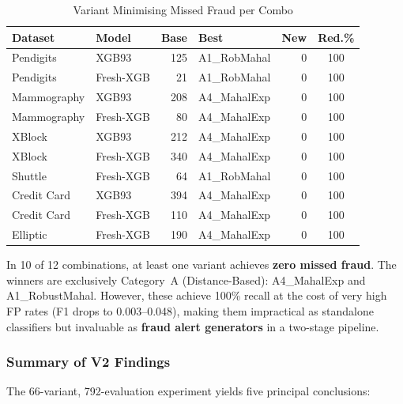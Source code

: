 \documentclass[journal]{IEEEtran}
\begin{document}
\begin{table}[!t]
\centering
\caption{Variant Minimising Missed Fraud per Combo}
\label{tab:missed_best}
\setlength{\tabcolsep}{3pt}
\begin{tabular}{@{}llrlrc@{}}
\toprule
\textbf{Dataset} & \textbf{Model} & \textbf{Base} & \textbf{Best} & \textbf{New} & \textbf{Red.\%} \\
\midrule
Pendigits  & XGB93     & 125 & A1\_RobMahal & 0 & 100 \\
Pendigits  & Fresh-XGB & 21  & A1\_RobMahal & 0 & 100 \\
Mammography & XGB93    & 208 & A4\_MahalExp & 0 & 100 \\
Mammography & Fresh-XGB & 80 & A4\_MahalExp & 0 & 100 \\
XBlock     & XGB93     & 212 & A4\_MahalExp & 0 & 100 \\
XBlock     & Fresh-XGB & 340 & A4\_MahalExp & 0 & 100 \\
Shuttle    & Fresh-XGB & 64  & A1\_RobMahal & 0 & 100 \\
Credit Card & XGB93    & 394 & A4\_MahalExp & 0 & 100 \\
Credit Card & Fresh-XGB & 110 & A4\_MahalExp & 0 & 100 \\
Elliptic   & Fresh-XGB & 190 & A4\_MahalExp & 0 & 100 \\
\bottomrule
\end{tabular}
\end{table}

In 10 of 12 combinations, at least one variant achieves \textbf{zero missed fraud}. The winners are exclusively Category~A (Distance-Based): A4\_MahalExp and A1\_RobustMahal. However, these achieve 100\% recall at the cost of very high FP rates (F1 drops to 0.003--0.048), making them impractical as standalone classifiers but invaluable as \textbf{fraud alert generators} in a two-stage pipeline.

\subsubsection{Summary of V2 Findings}

The 66-variant, 792-evaluation experiment yields five principal conclusions:
\end{document}
